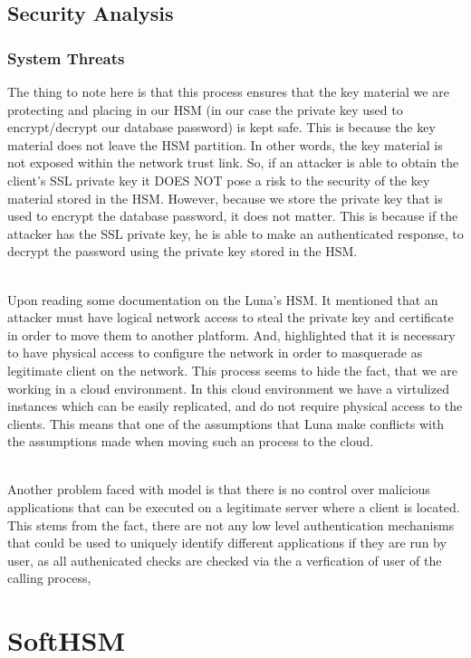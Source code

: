 		\subsection{Security Analysis}

			\subsubsection{System Threats}

			The thing to note here is that this process ensures that the key material we are protecting and placing in our HSM (in our case the private key used to encrypt/decrypt our database password) is kept safe. This is because the key material does not leave the HSM partition. In other words, the key material is not exposed within the network trust link. So, if an attacker is able to obtain the client's SSL private key it DOES NOT pose a risk to the security of the key material stored in the HSM. However, because we store the private key that is used to encrypt the database password, it does not matter. This is because if the attacker has the SSL private key, he is able to make an authenticated response, to decrypt the password using the private key stored in the HSM. \\\

			Upon reading some documentation on the Luna's HSM. It mentioned that an attacker must have logical network access to steal the private key and certificate in order to move them to another platform. And, highlighted that it is necessary to have physical access to configure the network in order to masquerade as legitimate client on the network. This process seems to hide the fact, that we are working in a cloud environment. In this cloud environment we have a  virtulized instances which can be easily replicated, and do not require physical access to the clients. This means that one of the assumptions that Luna make conflicts with the assumptions made when moving such an process to the cloud. \\\

			Another problem faced with model is that there is no control over malicious applications that can be executed on a legitimate server where a client is located. This stems from the fact, there are not any low level authentication mechanisms that could be used to uniquely identify different applications if they are run by user, as all authenicated checks are checked via the a verfication of user of the calling process,
	\section{SoftHSM}

